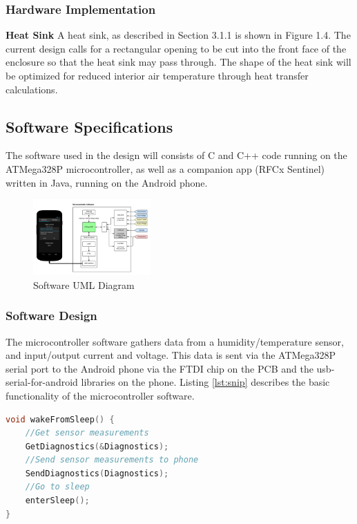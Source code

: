 \documentclass{article}
\begin{document}
{\subsubsection{Hardware Implementation}
\textbf{Heat Sink}
A heat sink, as described in Section 3.1.1 is shown in Figure 1.4.  The current design calls for a rectangular opening to be cut into the front face of the enclosure so that the heat sink may pass through.  The shape of the heat sink will be optimized for reduced interior air temperature through heat transfer calculations.

\subsection{Software Specifications}
The software used in the design will consists of C and C++ code running on the ATMega328P microcontroller, as well as a companion app (RFCx Sentinel) written in Java, running on the Android phone.
\begin{figure}[H]
	\centering
	\includegraphics[width=0.4\textwidth]{SoftwareUMLV2}
	\caption{Software UML Diagram}
	\label{fig:swuml}
\end{figure}

\subsubsection{Software Design}
The microcontroller software gathers data from a humidity/temperature sensor, and input/output current and voltage. This data is sent via the ATMega328P serial port to the Android phone via the FTDI chip on the PCB and the usb-serial-for-android libraries on the phone.
Listing \ref{lst:snip} describes the basic functionality of the microcontroller software.

\begin{lstlisting}[language=C,label=lst:snip,caption=MCU Flow Code Snippet]
void wakeFromSleep() {
    //Get sensor measurements
    GetDiagnostics(&Diagnostics);
    //Send sensor measurements to phone
    SendDiagnostics(Diagnostics);
    //Go to sleep
    enterSleep();
}
\end{lstlisting}

}
\end{document}
